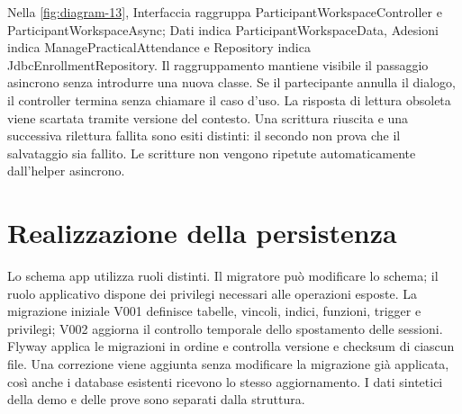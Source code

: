 \documentclass[11pt,a4paper]{article}
\begin{document}
\begin{landscape}
\begin{center}
%

\label{fig:diagram-13}
\end{center}

{\small Nella \cref{fig:diagram-13}, Interfaccia raggruppa ParticipantWorkspaceController e ParticipantWorkspaceAsync; Dati indica ParticipantWorkspaceData, Adesioni indica ManagePracticalAttendance e Repository indica JdbcEnrollmentRepository. Il raggruppamento mantiene visibile il passaggio asincrono senza introdurre una nuova classe. Se il partecipante annulla il dialogo, il controller termina senza chiamare il caso d'uso. La risposta di lettura obsoleta viene scartata tramite versione del contesto. Una scrittura riuscita e una successiva rilettura fallita sono esiti distinti: il secondo non prova che il salvataggio sia fallito. Le scritture non vengono ripetute automaticamente dall'helper asincrono.}

\end{landscape}

\clearpage\section{Realizzazione della persistenza}

Lo schema app utilizza ruoli distinti. Il migratore può modificare lo schema; il ruolo applicativo dispone dei privilegi necessari alle operazioni esposte. La migrazione iniziale V001 definisce tabelle, vincoli, indici, funzioni, trigger e privilegi; V002 aggiorna il controllo temporale dello spostamento delle sessioni. Flyway applica le migrazioni in ordine e controlla versione e checksum di ciascun file. Una correzione viene aggiunta senza modificare la migrazione già applicata, così anche i database esistenti ricevono lo stesso aggiornamento. I dati sintetici della demo e delle prove sono separati dalla struttura.
\end{document}
